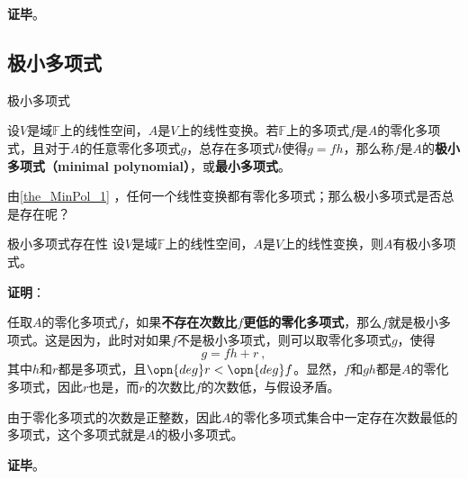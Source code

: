 \textbf{证毕}。



\subsection{极小多项式}



\begin{definition}{极小多项式}

设$V$是域$\mathbb{F}$上的线性空间，$A$是$V$上的线性变换。若$\mathbb{F}$上的多项式$f$是$A$的零化多项式，且对于$A$的任意零化多项式$g$，总存在多项式$h$使得$g=fh$，那么称$f$是$A$的\textbf{极小多项式（minimal polynomial）}，或\textbf{最小多项式}。

\end{definition}


由\autoref{the_MinPol_1} ，任何一个线性变换都有零化多项式；那么极小多项式是否总是存在呢？


\begin{theorem}{极小多项式存在性}
设$V$是域$\mathbb{F}$上的线性空间，$A$是$V$上的线性变换，则$A$有极小多项式。
\end{theorem}

\textbf{证明}：

任取$A$的零化多项式$f$，如果\textbf{不存在次数比$f$更低的零化多项式}，那么$f$就是极小多项式。这是因为，此时对如果$f$不是极小多项式，则可以取零化多项式$g$，使得
\begin{equation}\label{eq_MinPol_5}
g=fh+r~, 
\end{equation}
其中$h$和$r$都是多项式，且$\opn{deg}r<\opn{deg}f$。显然，$f$和$gh$都是$A$的零化多项式，因此$r$也是，而$r$的次数比$f$的次数低，与假设矛盾。

由于零化多项式的次数是正整数，因此$A$的零化多项式集合中一定存在次数最低的多项式，这个多项式就是$A$的极小多项式。


\textbf{证毕}。

















